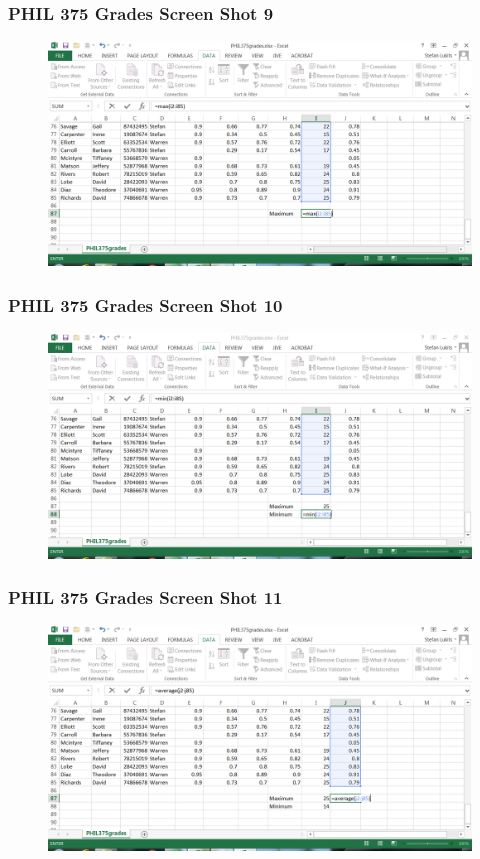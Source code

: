 \documentclass[xcolor=dvipsnames]{beamer}
\begin{document}
\begin{frame}
  \frametitle{PHIL 375 Grades Screen Shot 9}
  \begin{figure}[h]
    \includegraphics[scale=.42]{./e09.PNG}
  \end{figure}
\end{frame}

\begin{frame}
  \frametitle{PHIL 375 Grades Screen Shot 10}
  \begin{figure}[h]
    \includegraphics[scale=.42]{./e10.PNG}
  \end{figure}
\end{frame}

\begin{frame}
  \frametitle{PHIL 375 Grades Screen Shot 11}
  \begin{figure}[h]
    \includegraphics[scale=.42]{./e11.PNG}
  \end{figure}
\end{frame}
\end{document}
